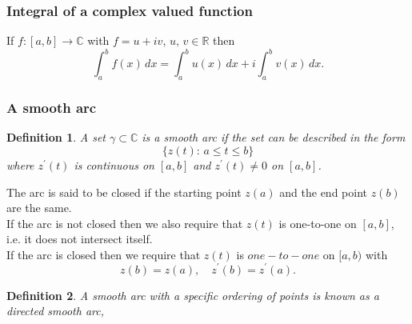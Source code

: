 \documentclass{article}
\newtheorem{definition}{Definition}
\begin{document}
\subsubsection{Integral of a complex valued function}
If $f:[a,b]\to\mathbb{C}$ with $f=u+iv$, $u,\,v\in\mathbb{R}$ then
\begin{equation}
    \int_a^b f(x)\,dx =  \int_a^b u(x)\,dx + i\int_a^b v(x)\,dx.
\end{equation}

\subsubsection{A smooth arc}
\begin{definition}
    A set $\gamma \subset \mathbb{C}$ is a smooth arc if the set can be described in the form
    \begin{equation}
        \{ z(t):\, a\leq t\leq b \}
    \end{equation}
    where $z^\prime (t)$ is continuous on $[a,b]$ and $z^\prime (t)\neq 0$ on $[a,b]$.
\end{definition}
The arc is said to be closed if the starting point $z(a)$ and the end point $z(b)$ are the same. \\
If the arc is not closed then we also require that $z(t)$ is one-to-one on $[a,b]$, i.e. it does not intersect itself.\\
If the arc is closed then we require that $z(t)$ is $one-to-one$ on $[a,b)$ with
\begin{equation}
    z(b)=z(a),\quad z^\prime(b) = z^\prime(a). \nonumber
\end{equation}
\begin{definition}
    A smooth arc with a specific ordering of points is known as a directed smooth arc,
\end{definition}
\end{document}
